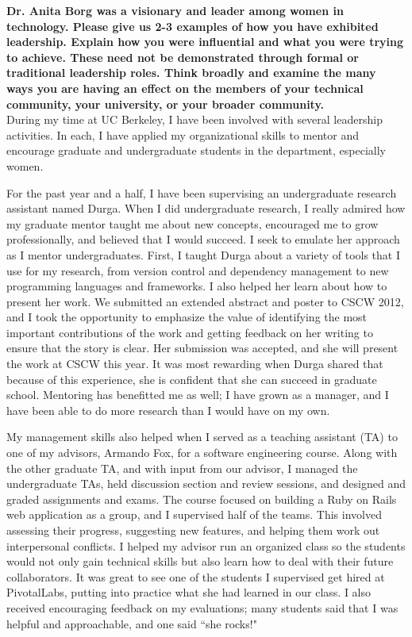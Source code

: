 \documentclass{article}
\begin{document}
	
\pagestyle{plain}

\textbf{Dr. Anita Borg was a visionary and leader among women in technology. Please give us 2-3 examples of how you have exhibited leadership. Explain how you were influential and what you were trying to achieve. These need not be demonstrated through formal or traditional leadership roles. Think broadly and examine the many ways you are having an effect on the members of your technical community, your university, or your broader community.}\\

During my time at UC Berkeley, I have been involved with several leadership activities.
In each, I have applied my organizational skills to mentor and encourage graduate and undergraduate students in the department, especially women.

For the past year and a half, I have been supervising an undergraduate research assistant named Durga.
When I did undergraduate research, I really admired how my graduate mentor taught me about new concepts, encouraged me to grow professionally, and believed that I would succeed.
I seek to emulate her approach as I mentor undergraduates.
First, I taught Durga about a variety of tools that I use for my research, from version control and dependency management to new programming languages and frameworks.
I also helped her learn about how to present her work.
We submitted an extended abstract and poster to CSCW 2012, and I took the opportunity to emphasize the value of identifying the most important contributions of the work and getting feedback on her writing to ensure that the story is clear.
Her submission was accepted, and she will present the work at CSCW this year.
It was most rewarding when Durga shared that because of this experience, she is confident that she can succeed in graduate school.
Mentoring has benefitted me as well; I have grown as a manager, and I have been able to do more research than I would have on my own.

My management skills also helped when I served as a teaching assistant (TA) to one of my advisors, Armando Fox, for a software engineering course.
Along with the other graduate TA, and with input from our advisor, I managed the undergraduate TAs, held discussion section and review sessions, and designed and graded assignments and exams.
The course focused on building a Ruby on Rails web application as a group, and I supervised half of the teams.
This involved assessing their progress, suggesting new features, and helping them work out interpersonal conflicts.
I helped my advisor run an organized class so the students would not only gain technical skills but also learn how to deal with their future collaborators.
It was great to see one of the students I supervised get hired at PivotalLabs, putting into practice what she had learned in our class.
I also received encouraging feedback on my evaluations; many students said that I was helpful and approachable, and one said ``she rocks!"
\end{document}
